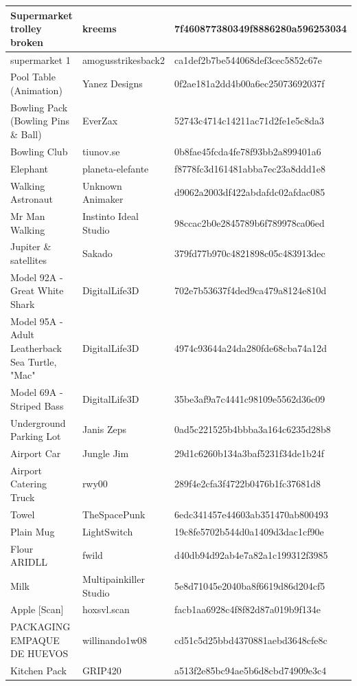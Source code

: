 \begin{longtable}{|p{6cm}|p{4cm}|p{6cm}|}
\hline
\endlastfoot
Supermarket trolley broken & kreems & 7f460877380349f8886280a596253034 \\
\hline
supermarket 1 & amogusstrikesback2 & ca1def2b7be544068def3cec5852c67e \\
\hline
Pool Table (Animation) & Yanez Designs & 0f2ae181a2dd4b00a6ec25073692037f \\
\hline
Bowling Pack (Bowling Pins \& Ball) & EverZax & 52743c4714c14211ac71d2fe1e5c8da3 \\
\hline
Bowling Club & tiunov.se & 0b8fae45fcda4fe78f93bb2a899401a6 \\
\hline
Elephant & planeta-elefante & f8778fc3d161481abba7ec23a8ddd1e8 \\
\hline
Walking Astronaut & Unknown Animaker & d9062a2003df422abdafdc02afdac085 \\
\hline
Mr Man Walking & Instinto Ideal Studio & 98ccac2b0e2845789b6f789978ca06ed \\
\hline
Jupiter \& satellites & Sakado & 379fd77b970c4821898c05c483913dec \\
\hline
Model 92A - Great White Shark & DigitalLife3D & 702e7b53637f4ded9ca479a8124e810d \\
\hline
Model 95A - Adult Leatherback Sea Turtle, "Mac" & DigitalLife3D & 4974c93644a24da280fde68cba74a12d \\
\hline
Model 69A - Striped Bass & DigitalLife3D & 35be3af9a7c4441c98109e5562d36c09 \\
\hline
Underground Parking Lot & Janis Zeps & 0ad5c221525b4bbba3a164c6235d28b8 \\
\hline
Airport Car & Jungle Jim & 29d1c6260b134a3baf5231f34de1b24f \\
\hline
Airport Catering Truck & rwy00 & 289f4e2cfa3f4722b0476b1fc37681d8 \\
\hline
Towel & TheSpacePunk & 6edc341457e44603ab351470ab800493 \\
\hline
Plain Mug & LightSwitch & 19c8fe5702b544d0a1409d3dac1cf90e \\
\hline
Flour ARIDLL & fwild & d40db94d92ab4e7a82a1c199312f3985 \\
\hline
Milk & Multipainkiller Studio & 5e8d71045e2040ba8f6619d86d204cf5 \\
\hline
Apple [Scan] & hoxsvl.scan & facb1aa6928c4f8f82d87a019b9f134e \\
\hline
PACKAGING EMPAQUE DE HUEVOS & willinando1w08 & cd51c5d25bbd4370881aebd3648cfe8c \\
\hline
Kitchen Pack & GRIP420 & a513f2e85bc94ae5b6d8cbd74909e3c4 \\

\end{longtable}
